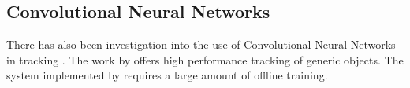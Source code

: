 \subsection{Convolutional Neural Networks}
  There has also been investigation into the use of Convolutional Neural Networks in tracking \cite{CNNTracking}.
  The work by \citeauthor{CNNTracking} offers high performance tracking of generic objects.
  The system implemented by \citeauthor{CNNTracking} requires a large amount of offline training.
